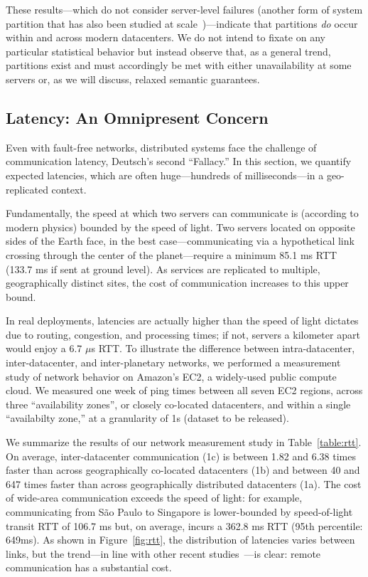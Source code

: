 These results---which do not consider server-level failures (another
form of system partition that has also been studied at
scale~\cite{google-availability})---indicate that partitions
\textit{do} occur within and across modern datacenters. We do not
intend to fixate on any particular statistical behavior but instead
observe that, as a general trend, partitions exist and must
accordingly be met with either unavailability at some servers or, as
we will discuss, relaxed semantic guarantees.

\subsection{Latency: An Omnipresent Concern}

Even with fault-free networks, distributed systems face the challenge
of communication latency, Deutsch's second ``Fallacy.'' In this
section, we quantify expected latencies, which are often
huge---hundreds of milliseconds---in a geo-replicated context.

Fundamentally, the speed at which two servers can communicate is
(according to modern physics) bounded by the speed of light. Two
servers located on opposite sides of the Earth face, in the best
case---communicating via a hypothetical link crossing through the
center of the planet---require a minimum 85.1 ms RTT (133.7 ms if sent
at ground level). As services are replicated to multiple,
geographically distinct sites, the cost of communication increases to
this upper bound.

In real deployments, latencies are actually higher than the speed of
light dictates due to routing, congestion, and processing times; if
not, servers a kilometer apart would enjoy a 6.7 $\mu$s RTT. To
illustrate the difference between intra-datacenter, inter-datacenter,
and inter-planetary networks, we performed a measurement study of
network behavior on Amazon's EC2, a widely-used public compute
cloud. We measured one week of ping times between all seven EC2
regions, across three ``availability zones'', or closely co-located
datacenters, and within a single ``availabilty zone,'' at a
granularity of 1s (dataset to be released).

We summarize the results of our network measurement study in
Table~\ref{table:rtt}. On average, inter-datacenter communication (1c)
is between 1.82 and 6.38 times faster than across geographically
co-located datacenters (1b) and between 40 and 647 times faster than
across geographically distributed datacenters (1a). The cost of
wide-area communication exceeds the speed of light: for example,
communicating from S\~{a}o Paulo to Singapore is lower-bounded by
speed-of-light transit RTT of 106.7 ms but, on average, incurs a 362.8
ms RTT (95th percentile: 649ms). As shown in Figure~\ref{fig:rtt}, the
distribution of latencies varies between links, but the trend---in
line with other recent studies~\cite{mdcc, redblue}---is clear: remote
communication has a substantial cost.

